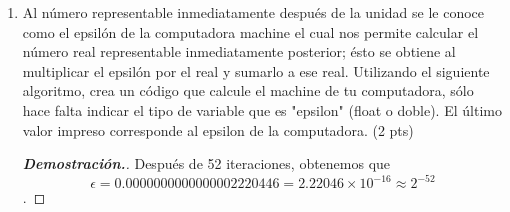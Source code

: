 \documentclass{article}
\begin{document}
\begin{enumerate}
		
		\item Al n\'umero representable inmediatamente despu\'es de la unidad se le conoce como el epsil\'on de la computadora
		machine el cual nos permite calcular el n\'umero real representable inmediatamente posterior; \'esto se obtiene
		al multiplicar el epsil\'on por el real y sumarlo a ese real. Utilizando el siguiente algoritmo, crea un c\'odigo
		que calcule el machine de tu computadora, s\'olo hace falta indicar el tipo de variable que es "epsilon" (float o
		doble). El \'ultimo valor impreso corresponde al epsilon de la computadora. (2 pts)
		\begin{mdframed}[
			linecolor=darkgray,
			backgroundcolor=pearl]
			\begin{proof}[\textbf{Demostraci\'on.}]
				Despu\'es de 52 iteraciones, obtenemos que $$\epsilon = 0.0000000000000002220446 = 2.22046\times10^{-16} \approx 2^{-52}$$.
				
			\end{proof}
		\end{mdframed}
		
	\end{enumerate}
\end{document}
